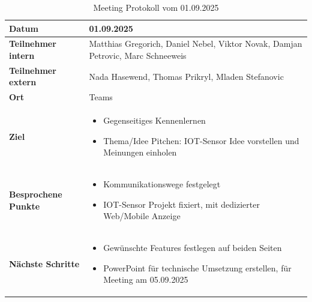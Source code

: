 \documentclass{article}
\begin{document}
\begin{table}[H]
  \centering
  \begin{tabularx}{\textwidth}{|>{\columncolor{black!10}}l|X|}
    \hline
    \textbf{Datum} & 01.09.2025 \\
    \hline
    \textbf{Teilnehmer intern} & Matthias Gregorich, Daniel Nebel, Viktor Novak, Damjan Petrovic, Marc Schneeweis \\ 
    \hline
    \textbf{Teilnehmer extern} & Nada Hasewend, Thomas Prikryl, Mladen Stefanovic  \\
    \hline
    \textbf{Ort} & Teams \\ 
    \hline
    \textbf{Ziel} &
    \vspace{-0.5em}
    \begin{itemize}
        \item Gegenseitiges Kennenlernen
        \item Thema/Idee Pitchen: IOT-Sensor Idee vorstellen und Meinungen einholen
    \end{itemize} \\
    \hline
    \textbf{Besprochene Punkte} &
    \vspace{-0.5em}
    \begin{itemize}
        \item Kommunikationswege festgelegt
        \item IOT-Sensor Projekt fixiert, mit dedizierter Web/Mobile Anzeige
    \end{itemize} \\
    \hline
    \textbf{Nächste Schritte} &
    \vspace{-0.5em}
    \begin{itemize}
        \item Gewünschte Features festlegen auf beiden Seiten
        \item PowerPoint für technische Umsetzung erstellen, für Meeting am 05.09.2025
    \end{itemize} \\
    \hline
  \end{tabularx}
  \caption{Meeting Protokoll vom 01.09.2025}
  \label{tab:meeting-01-09-2025}
\end{table}
\end{document}
